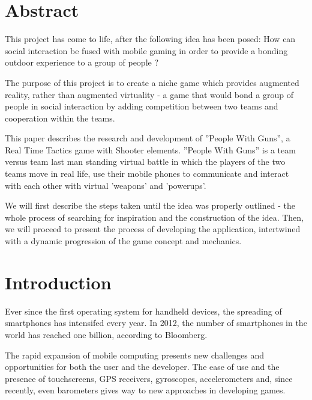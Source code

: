 
\section{Abstract}

This project has come to life, after the following idea has been posed: How can
social interaction be fused with mobile gaming in order to provide a bonding
outdoor experience to a group of people ? 

The purpose of this project is to create a niche game which provides augmented
reality, rather than augmented virtuality - a game that would bond a group of
people in social interaction by adding competition between two teams and
cooperation within the teams.\newline

This paper describes the research and development of ''People With Guns'', a
Real Time Tactics game with Shooter elements. ''People With Guns'' is a team
versus team last man standing virtual battle in which the players of the two
teams move in real life, use their mobile phones to communicate and interact
with each other with virtual 'weapons' and 'powerups'.\newline

We will first describe the steps taken until the idea was properly outlined -
the whole process of searching for inspiration and the construction of the idea.
Then, we will proceed to present the process of developing the application,
intertwined with a dynamic progression of the game concept and
mechanics.\newline



\section{Introduction}

Ever since the first operating system for handheld devices, the spreading of
smartphones has intensifed every year. In 2012, the number of smartphones in the
world has reached one billion, according to Bloomberg\cite{bloomberg}. \newline

The rapid expansion of mobile computing presents new challenges and
opportunities for both the user and the developer. The ease of use and the
presence of touchscreens, GPS receivers, gyroscopes, accelerometers and, since
recently, even barometers gives way to new approaches in developing
games.\newline

